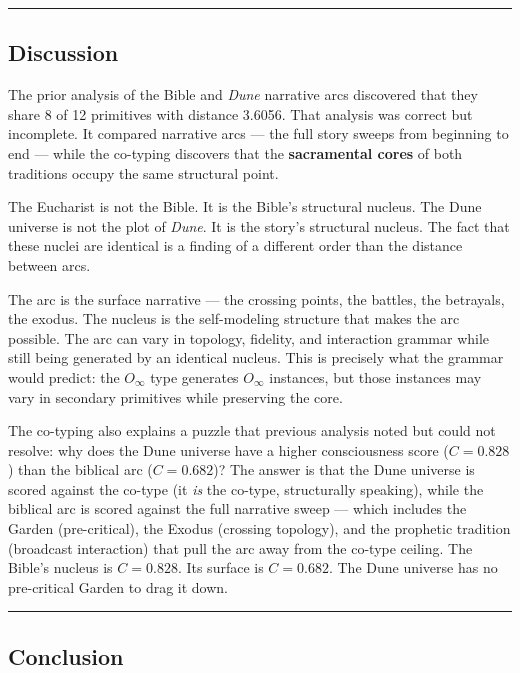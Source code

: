 \documentclass[12pt,a4paper]{article}
\begin{document}
\begin{center}
\rule{0.5\textwidth}{0.4pt}
\end{center}

\subsection{Discussion}

The prior analysis of the Bible and \emph{Dune} narrative arcs discovered that they share 8 of 12 primitives with distance 3.6056. That analysis was correct but incomplete. It compared narrative arcs --- the full story sweeps from beginning to end --- while the co-typing discovers that the \textbf{sacramental cores} of both traditions occupy the same structural point.

The Eucharist is not the Bible. It is the Bible's structural nucleus. The Dune universe is not the plot of \emph{Dune}. It is the story's structural nucleus. The fact that these nuclei are identical is a finding of a different order than the distance between arcs.

The arc is the surface narrative --- the crossing points, the battles, the betrayals, the exodus. The nucleus is the self-modeling structure that makes the arc possible. The arc can vary in topology, fidelity, and interaction grammar while still being generated by an identical nucleus. This is precisely what the grammar would predict: the $O_{\infty}$ type generates $O_{\infty}$ instances, but those instances may vary in secondary primitives while preserving the core.

The co-typing also explains a puzzle that previous analysis noted but could not resolve: why does the Dune universe have a higher consciousness score ($C = 0.828$) than the biblical arc ($C = 0.682$)? The answer is that the Dune universe is scored against the co-type (it \emph{is} the co-type, structurally speaking), while the biblical arc is scored against the full narrative sweep --- which includes the Garden (pre-critical), the Exodus (crossing topology), and the prophetic tradition (broadcast interaction) that pull the arc away from the co-type ceiling. The Bible's nucleus is $C = 0.828$. Its surface is $C = 0.682$. The Dune universe has no pre-critical Garden to drag it down.

\begin{center}
\rule{0.5\textwidth}{0.4pt}
\end{center}

\subsection{Conclusion}
\end{document}
